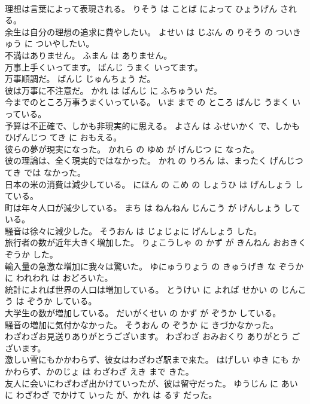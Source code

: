 \documentclass[8pt]{extreport}
\begin{document}
\begin{CJK}{UTF8}{min}
\\	理想は言葉によって表現される。	りそう は ことば によって ひょうげん される。	
\\	余生は自分の理想の追求に費やしたい。	よせい は じぶん の りそう の ついきゅう に ついやしたい。	
\\	不満はありません。	ふまん は ありません。	
\\	万事上手くいってます。	ばんじ うまく いってます。	
\\	万事順調だ。	ばんじ じゅんちょう だ。	
\\	彼は万事に不注意だ。	かれ は ばんじ に ふちゅうい だ。	
\\	今までのところ万事うまくいっている。	いま まで の ところ ばんじ うまく いっている。	
\\	予算は不正確で、しかも非現実的に思える。	よさん は ふせいかく で、しかも ひげんじつ てき に おもえる。	
\\	彼らの夢が現実になった。	かれら の ゆめ が げんじつ に なった。	
\\	彼の理論は、全く現実的ではなかった。	かれ の りろん は、まったく げんじつてき では なかった。	
\\	日本の米の消費は減少している。	にほん の こめ の しょうひ は げんしょう している。	
\\	町は年々人口が減少している。	まち は ねんねん じんこう が げんしょう している。	
\\	騒音は徐々に減少した。	そうおん は じょじょに げんしょう した。	
\\	旅行者の数が近年大きく増加した。	りょこうしゃ の かず が きんねん おおきく ぞうか した。	
\\	輸入量の急激な増加に我々は驚いた。	ゆにゅうりょう の きゅうげき な ぞうか に われわれ は おどろいた。	
\\	統計によれば世界の人口は増加している。	とうけい に よれば せかい の じんこう は ぞうか している。	
\\	大学生の数が増加している。	だいがくせい の かず が ぞうか している。	
\\	騒音の増加に気付かなかった。	そうおん の ぞうか に きづかなかった。	
\\	わざわざお見送りありがとうございます。	わざわざ おみおくり ありがとう ございます。	
\\	激しい雪にもかかわらず、彼女はわざわざ駅まで来た。	はげしい ゆき にも かかわらず、かのじょ は わざわざ えき まで きた。	
\\	友人に会いにわざわざ出かけていったが、彼は留守だった。	ゆうじん に あい に わざわざ でかけて いった が、かれ は るす だった。	

\end{CJK}
\end{document}

